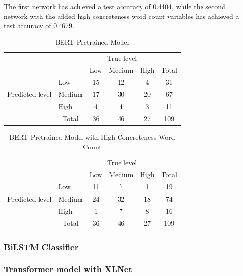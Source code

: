 \documentclass[12pt, a4paper]{article}
\begin{document}
The first network has achieved a test accuracy of 0.4404, while the second network with the added high concreteness word count variables has achieved a test accuracy of 0.4679.

\begin{table}[ht]
\centering
\begin{tabular}{l|l|c|c|c|c}
\multicolumn{2}{c}{}&\multicolumn{3}{c}{True level}&\\
\cline{3-5}
\multicolumn{2}{c|}{}&Low&Medium&High&\multicolumn{1}{c}{Total}\\
\cline{2-5}
\multirow{3}{*}{Predicted level}& Low & 15 & 12 & 4 & 31\\
\cline{2-5}
& Medium & 17 & 30 & 20 & 67\\
\cline{2-5}
& High & 4 & 4 & 3 & 11\\
\cline{2-5}
\multicolumn{1}{c}{} & \multicolumn{1}{c}{Total} & \multicolumn{1}{c}{36} & \multicolumn{    1}{c}{46} & \multicolumn{    1}{c}{27} & \multicolumn{1}{c}{109}\\
\end{tabular}
\caption{BERT Pretrained Model}
\label{table:pretrained}
\end{table}

\begin{table}[ht]
\centering
\begin{tabular}{l|l|c|c|c|c}
\multicolumn{2}{c}{}&\multicolumn{3}{c}{True level}&\\
\cline{3-5}
\multicolumn{2}{c|}{}&Low&Medium&High&\multicolumn{1}{c}{Total}\\
\cline{2-5}
\multirow{3}{*}{Predicted level}& Low & 11 & 7 & 1 & 19\\
\cline{2-5}
& Medium & 24 & 32 & 18 & 74\\
\cline{2-5}
& High & 1 & 7 & 8 & 16\\
\cline{2-5}
\multicolumn{1}{c}{} & \multicolumn{1}{c}{Total} & \multicolumn{1}{c}{36} & \multicolumn{    1}{c}{46} & \multicolumn{    1}{c}{27} & \multicolumn{1}{c}{109}\\
\end{tabular}
\caption{BERT Pretrained Model with High Concreteness Word Count}
\label{table:pretrained2}
\end{table}

\subsubsection{BiLSTM Classifier}

\subsubsection{Transformer model with XLNet}
\end{document}
